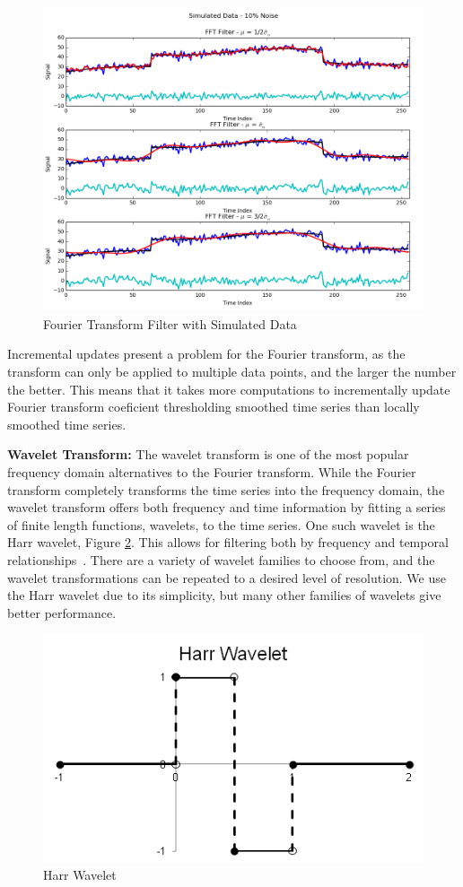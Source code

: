 \documentclass[11pt]{article}
\newcommand{\vs}{\vspace{0.1in}}
\theoremstyle{definition}
\begin{document}
\begin{figure}
\centering
\includegraphics[width = 0.65 \textwidth]{FFTCompare.png}
\caption{Fourier Transform Filter with Simulated Data}
\label{fftcompare}
\end{figure}

Incremental updates present a problem for the Fourier transform, as the transform can only be applied to multiple data points, and the larger the number the better. This means that it takes more computations to incrementally update Fourier transform coeficient thresholding smoothed time series than locally smoothed time series.

\vs
\noindent
\textbf{Wavelet Transform:} The wavelet transform is one of the most popular frequency domain alternatives to the Fourier transform. While the Fourier transform completely transforms the time series into the frequency domain, the wavelet transform offers both frequency and time information by fitting a series of finite length functions, wavelets, to the time series. One such wavelet is the Harr wavelet, Figure \ref{harrwavelet}. This allows for filtering both by frequency and temporal relationships~\cite{Graps95}. There are a variety of wavelet families to choose from, and the wavelet transformations can be repeated to a desired level of resolution. We use the Harr wavelet due to its simplicity, but many other families of wavelets give better performance.

\begin{figure}
\centering
\includegraphics[width = 0.65 \textwidth]{HarrWavelet.png}
\caption{Harr Wavelet}
\label{harrwavelet}
\end{figure}
\end{document}
